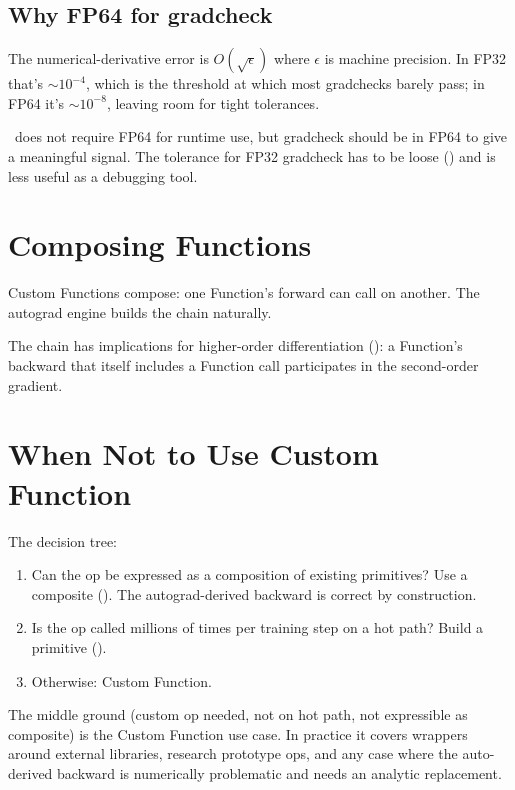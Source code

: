 \subsection{Why FP64 for gradcheck}
\label{ssec:custom_functions:gradcheck_fp64}

The numerical-derivative error is $O(\sqrt{\epsilon})$ where
$\epsilon$ is machine precision. In FP32 that's $\sim 10^{-4}$,
which is the threshold at which most gradchecks barely pass; in
FP64 it's $\sim 10^{-8}$, leaving room for tight tolerances.

\Lucid\ does not require FP64 for runtime use, but gradcheck
should be in FP64 to give a meaningful signal. The tolerance for
FP32 gradcheck has to be loose () and is less
useful as a debugging tool.

\section{Composing Functions}
\label{sec:custom_functions:composing}

Custom Functions compose: one Function's forward can call
 on another. The autograd engine builds the chain
naturally.

The chain has implications for higher-order differentiation
(): a Function's backward that itself
includes a Function call participates in the second-order
gradient.

\section{When Not to Use Custom Function}
\label{sec:custom_functions:when_not}

The decision tree:

\begin{enumerate}
  \item Can the op be expressed as a composition of existing
    primitives? Use a composite
    (). The autograd-derived backward is
    correct by construction.
  \item Is the op called millions of times per training step on
    a hot path? Build a primitive
    ().
  \item Otherwise: Custom Function.
\end{enumerate}

The middle ground (custom op needed, not on hot path, not
expressible as composite) is the Custom Function use case. In
practice it covers wrappers around external libraries, research
prototype ops, and any case where the auto-derived backward is
numerically problematic and needs an analytic replacement.

